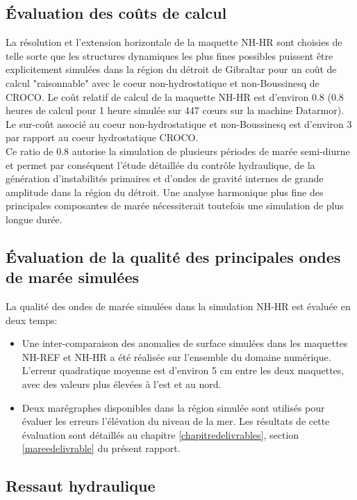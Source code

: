 \documentclass[a4paper,11pt]{report}
\begin{document}
\subsection{Évaluation des coûts de calcul}

 La résolution et l'extension horizontale de la maquette NH-HR sont choisies de telle sorte que les structures dynamiques les plus fines possibles puissent être explicitement simulées dans la région du détroit de Gibraltar pour un coût de calcul "raisonnable" avec le coeur non-hydrostatique et non-Boussinesq de CROCO. Le coût relatif de calcul de la maquette NH-HR est d'environ 0.8 (0.8 heures de calcul pour 1 heure simulée sur 447 cœurs sur la machine Datarmor). Le sur-coût associé au coeur non-hydrostatique et non-Boussinesq est d'environ 3 par rapport au coeur hydrostatique CROCO.\\
Ce ratio de 0.8 autorise la simulation de plusieurs périodes de marée semi-diurne et permet par conséquent l'étude détaillée du contrôle hydraulique, de la génération d'instabilités primaires et d'ondes de gravité internes de grande amplitude dans la région du détroit. Une analyse harmonique plus fine des principales composantes de marée nécessiterait toutefois une simulation de plus longue durée.

\subsection{Évaluation de la qualité des principales ondes de marée simulées}
La qualité des ondes de marée simulées dans la simulation NH-HR est évaluée en deux temps:
\begin{itemize}
	\item Une inter-comparaison des anomalies de surface simulées dans les maquettes NH-REF et NH-HR a été réalisée sur l'ensemble du domaine numérique. L'erreur quadratique moyenne est d'environ 5 cm entre les deux maquettes, avec des valeurs plus élevées à l'est et au nord. 
	\item Deux marégraphes disponibles dans la région simulée sont utilisés pour évaluer les erreurs l'élévation du niveau de la mer. Les résultats de cette évaluation sont détaillés au chapitre \ref{chapitredelivrables}, section \ref{mareedelivrable} du présent rapport.
\end{itemize}

\subsection{Ressaut hydraulique}
\end{document}
